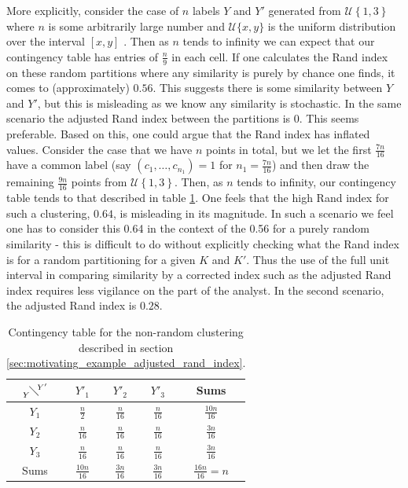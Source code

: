 \documentclass[12pt]{article} %
\begin{document}
More explicitly, consider the case of $n$ labels $Y$ and $Y'$ generated from $\mathcal{U}\left\{1,3\right\}$ where $n$ is some arbitrarily large number and $\mathcal{U}\{x,y\}$ is the uniform distribution over the interval $[x,y]$ . Then as $n$ tends to infinity we can expect that our contingency table has entries of $\frac{n}{9}$ in each cell. If one calculates the Rand index on these random partitions where any similarity is purely by chance one finds, it comes to (approximately) $0.56$. This suggests there is some similarity between $Y$ and $Y'$, but this is misleading as we know any similarity is stochastic. In the same scenario the adjusted Rand index between the partitions is 0. This seems preferable. Based on this, one could argue that the Rand index has inflated values. Consider the case that we have $n$ points in total, but we let the first $\frac{7n}{16}$ have a common label (say $\left(c_1,\ldots,c_{n_1}\right)=1$ for $n_1 = \frac{7n}{16}$) and then draw the remaining $\frac{9n}{16}$ points from $\mathcal{U}\left\{1,3\right\}$. Then, as $n$ tends to infinity, our contingency table tends to that described in table \ref{table:rand_contingency_example}. One feels that the high Rand index for such a clustering, $0.64$, is misleading in its magnitude. In such a scenario we feel one has to consider this 0.64 in the context of the 0.56 for a purely random similarity - this is difficult to do without explicitly checking what the Rand index is for a random partitioning for a given $K$ and $K'$. Thus the use of the full unit interval in comparing similarity by a corrected index such as the adjusted Rand index requires less vigilance on the part of the analyst. In the second scenario, the adjusted Rand index is $0.28$.

\begin{table}[] 
	\centering
	\begin{tabular}{c|ccc|c} 
		$ {{} \atop Y}  \!\diagdown\! ^{Y'}$	& $Y'_1$	& $Y'_2$	& $Y'_3 $	& Sums	\\ 
		\hline
		$Y_1$		& $\frac{n}{2}$	& $\frac{n}{16}$ & $\frac{n}{16}$	& $\frac{10n}{16}$	\\
		$Y_2$		& $\frac{n}{16}$	& $\frac{n}{16}$	& $\frac{n}{16}$	& $\frac{3n}{16}$	\\
		$Y_3$	& $\frac{n}{16}$	& $\frac{n}{16}$	& $\frac{n}{16}$	& $\frac{3n}{16}$	\\ 
		\hline
		Sums	& $\frac{10n}{16}$	&  $\frac{3n}{16}$	& $\frac{3n}{16}$	& $\frac{16n}{16} = n$         
	\end{tabular}
	\caption{Contingency table for the non-random clustering described in section \ref{sec:motivating_example_adjusted_rand_index}.}
	\label{table:rand_contingency_example}
\end{table}
\end{document}
